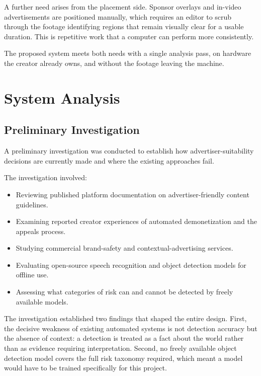 \documentclass[12pt,a4paper,twoside]{report}
\begin{document}
A further need arises from the placement side. Sponsor overlays and in-video advertisements are positioned manually, which requires an editor to scrub through the footage identifying regions that remain visually clear for a usable duration. This is repetitive work that a computer can perform more consistently.

The proposed system meets both needs with a single analysis pass, on hardware the creator already owns, and without the footage leaving the machine.

\chapter{System Analysis}

\section{Preliminary Investigation}

A preliminary investigation was conducted to establish how advertiser-suitability decisions are currently made and where the existing approaches fail.

The investigation involved:

\begin{itemize}
\item Reviewing published platform documentation on advertiser-friendly content guidelines.
\item Examining reported creator experiences of automated demonetization and the appeals process.
\item Studying commercial brand-safety and contextual-advertising services.
\item Evaluating open-source speech recognition and object detection models for offline use.
\item Assessing what categories of risk can and cannot be detected by freely available models.
\end{itemize}

The investigation established two findings that shaped the entire design. First, the decisive weakness of existing automated systems is not detection accuracy but the absence of context: a detection is treated as a fact about the world rather than as evidence requiring interpretation. Second, no freely available object detection model covers the full risk taxonomy required, which meant a model would have to be trained specifically for this project.
\end{document}
